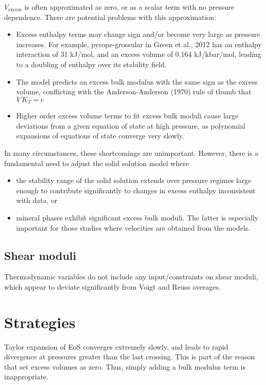 \documentclass[review]{elsarticle}
\begin{document}
\noindent $V_{\textrm{excess}}$ is often approximated as zero, or as a scalar term with no pressure dependence. There are potential problems with this approximation:
\begin{itemize}
\item Excess enthalpy terms may change sign and/or become very large as pressure increases. For example, pyrope-grossular in Green et al., 2012 has an enthalpy interaction of 31 kJ/mol, and an excess volume of 0.164 kJ/kbar/mol, leading to a doubling of enthalpy over its stability field. 
\item The model predicts an excess bulk modulus with the same sign as the excess volume, conflicting with the Anderson-Anderson (1970) rule of thumb that $V\, K_T = c$ 
\item Higher order excess volume terms to fit excess bulk moduli cause large deviations from a given equation of state at high pressure, as polynomial expansions of equations of state converge very slowly.
\end{itemize}

\noindent In many circumstances, these shortcomings are unimportant. However, there is a fundamental need to adjust the solid solution model where
\begin{itemize}
\item the stability range of the solid solution extends over pressure regimes large enough to contribute significantly to changes in excess enthalpy inconsistent with data, or
\item mineral phases exhibit significant excess bulk moduli. The latter is especially important for those studies where velocities are obtained from the models.
\end{itemize}

\subsection{Shear moduli}
Thermodynamic variables do not include any input/constraints on shear moduli, which appear to deviate significantly from Voigt and Reuss averages.

\section{Strategies}
Taylor expansion of EoS converges extremely slowly, and leads to rapid divergence at pressures greater than the last crossing. This is part of the reason that \cite{SLB2011} set excess volumes as zero. Thus, simply adding a bulk modulus term is inappropriate.
\end{document}
